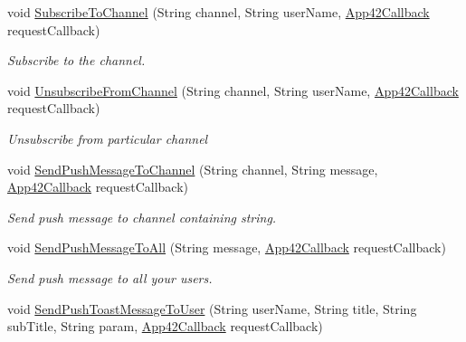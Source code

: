 \begin{DoxyCompactItemize}
void \hyperlink{classcom_1_1shephertz_1_1app42_1_1paas_1_1sdk_1_1windows_1_1push_1_1_push_notification_service_a7fac4da15112e3de93769287b367f8c6}{Subscribe\+To\+Channel} (String channel, String user\+Name, \hyperlink{interfacecom_1_1shephertz_1_1app42_1_1paas_1_1sdk_1_1windows_1_1_app42_callback}{App42\+Callback} request\+Callback)
\begin{DoxyCompactList}\small\item\em Subscribe to the channel. \end{DoxyCompactList}\item 
void \hyperlink{classcom_1_1shephertz_1_1app42_1_1paas_1_1sdk_1_1windows_1_1push_1_1_push_notification_service_a743206b980e1c728fecfaf8fdeac318e}{Unsubscribe\+From\+Channel} (String channel, String user\+Name, \hyperlink{interfacecom_1_1shephertz_1_1app42_1_1paas_1_1sdk_1_1windows_1_1_app42_callback}{App42\+Callback} request\+Callback)
\begin{DoxyCompactList}\small\item\em Unsubscribe from particular channel \end{DoxyCompactList}\item 
void \hyperlink{classcom_1_1shephertz_1_1app42_1_1paas_1_1sdk_1_1windows_1_1push_1_1_push_notification_service_ac777521c5db5a83b495debb3f5f488fa}{Send\+Push\+Message\+To\+Channel} (String channel, String message, \hyperlink{interfacecom_1_1shephertz_1_1app42_1_1paas_1_1sdk_1_1windows_1_1_app42_callback}{App42\+Callback} request\+Callback)
\begin{DoxyCompactList}\small\item\em Send push message to channel containing string. \end{DoxyCompactList}\item 
void \hyperlink{classcom_1_1shephertz_1_1app42_1_1paas_1_1sdk_1_1windows_1_1push_1_1_push_notification_service_a0182f91e212c9807043eb92daba597d1}{Send\+Push\+Message\+To\+All} (String message, \hyperlink{interfacecom_1_1shephertz_1_1app42_1_1paas_1_1sdk_1_1windows_1_1_app42_callback}{App42\+Callback} request\+Callback)
\begin{DoxyCompactList}\small\item\em Send push message to all your users. \end{DoxyCompactList}\item 
void \hyperlink{classcom_1_1shephertz_1_1app42_1_1paas_1_1sdk_1_1windows_1_1push_1_1_push_notification_service_a58bf8d3619310fcc3967b9ce7049cfc5}{Send\+Push\+Toast\+Message\+To\+User} (String user\+Name, String title, String sub\+Title, String param, \hyperlink{interfacecom_1_1shephertz_1_1app42_1_1paas_1_1sdk_1_1windows_1_1_app42_callback}{App42\+Callback} request\+Callback)

\end{DoxyCompactItemize}
